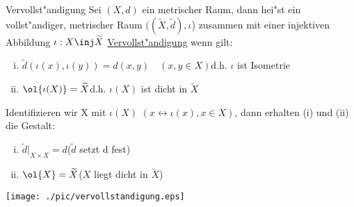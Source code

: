 \begin{definition}\label{8.7} Vervollst"andigung
Sei $(X,d)$ ein metrischer Raum, dann hei"st ein vollst"andiger, metrischer Raum $((\widetilde{X},\widetilde{d}),\iota$) zusammen mit einer injektiven Abbildung $\iota :X\inj\widetilde{X}$ \ul{Vervollst"andigung} wenn gilt:
\begin{enumerate}[(i)]
\item $\widetilde{d}(\iota (x),\iota (y))= d(x,y)\quad (x,y\in X)$\hfill d.h. $\iota$ ist Isometrie
\item $\ol{\iota (X)}=\widetilde{X}$\hfill d.h. $\iota (X)$ ist dicht in $\widetilde{X}$
\end{enumerate}
Identifizieren wir X mit $\iota (X)$ $(x\leftrightarrow \iota (x), x\in X)$, dann erhalten (i) und (ii) die Gestalt:
\begin{enumerate}[(i)']
\item $\widetilde{d}|_{X\times X} =d$\hfill {\scriptsize ($\widetilde{d}$ setzt d fest)}
\item $\ol{X} = \widetilde{X}$\hfill {\scriptsize ($X$ liegt dicht in $\widetilde{X}$)}
\end{enumerate}
\texttt{[image: ./pic/vervollstandigung.eps]}
\end{definition}

